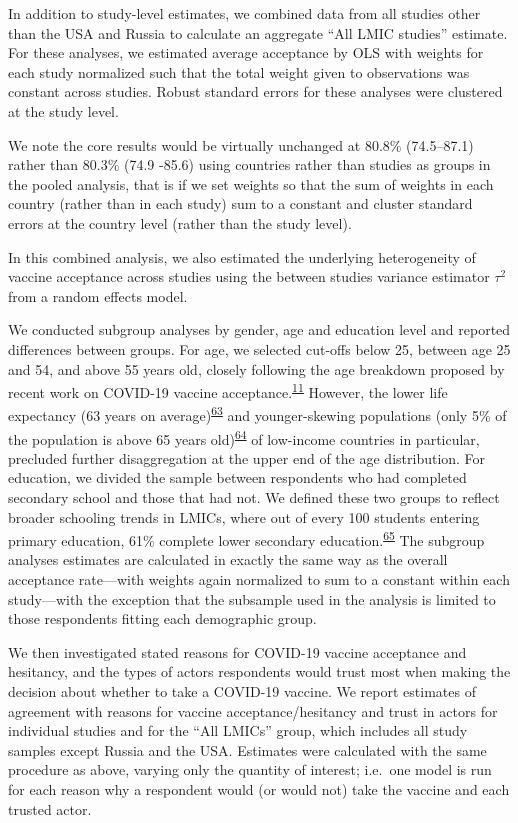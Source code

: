 \documentclass[
  12pt,
]{article}
\begin{document}
In addition to study-level estimates, we combined data from all studies other than the USA and Russia to calculate an aggregate ``All LMIC studies'' estimate. For these analyses, we estimated average acceptance by OLS with weights for each study normalized such that the total weight given to observations was constant across studies. Robust standard errors for these analyses were clustered at the study level.

We note the core results would be virtually unchanged at 80.8\% (74.5--87.1) rather than 80.3\% (74.9 -85.6) using countries rather than studies as groups in the pooled analysis, that is if we set weights so that the sum of weights in each country (rather than in each study) sum to a constant and cluster standard errors at the country level (rather than the study level).

In this combined analysis, we also estimated the underlying heterogeneity of vaccine acceptance across studies using the between studies variance estimator \(\tau^2\) from a random effects model.

We conducted subgroup analyses by gender, age and education level and reported differences between groups. For age, we selected cut-offs below 25, between age 25 and 54, and above 55 years old, closely following the age breakdown proposed by recent work on COVID-19 vaccine acceptance.\textsuperscript{\protect\hyperlink{ref-lazarus2020nature}{11}} However, the lower life expectancy (63 years on average)\textsuperscript{\protect\hyperlink{ref-wbage}{63}} and younger-skewing populations (only 5\% of the population is above 65 years old)\textsuperscript{\protect\hyperlink{ref-WorldBanksubSahara}{64}} of low-income countries in particular, precluded further disaggregation at the upper end of the age distribution. For education, we divided the sample between respondents who had completed secondary school and those that had not. We defined these two groups to reflect broader schooling trends in LMICs, where out of every 100 students entering primary education, 61\% complete lower secondary education.\textsuperscript{\protect\hyperlink{ref-world2017world}{65}} The subgroup analyses estimates are calculated in exactly the same way as the overall acceptance rate---with weights again normalized to sum to a constant within each study---with the exception that the subsample used in the analysis is limited to those respondents fitting each demographic group.

We then investigated stated reasons for COVID-19 vaccine acceptance and hesitancy, and the types of actors respondents would trust most when making the decision about whether to take a COVID-19 vaccine. We report estimates of agreement with reasons for vaccine acceptance/hesitancy and trust in actors for individual studies and for the ``All LMICs'' group, which includes all study samples except Russia and the USA. Estimates were calculated with the same procedure as above, varying only the quantity of interest; i.e.~one model is run for each reason why a respondent would (or would not) take the vaccine and each trusted actor.
\end{document}
